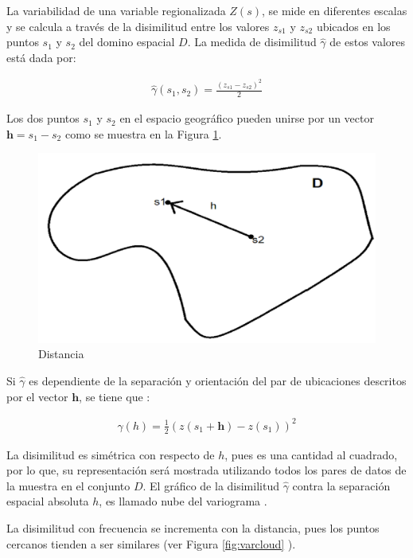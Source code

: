 \documentclass[
]{book}
\begin{document}
La variabilidad de una variable regionalizada \(Z(s)\), se mide en diferentes escalas y se calcula a través de la disimilitud entre los valores \(z_{s1}\) y \(z_{s2}\) ubicados en los puntos \(s_1\) y \(s_2\) del domino espacial \(D\). La medida de disimilitud \(\hat{\gamma}\) de estos valores está dada por:

\begin{align}
  \hat{\gamma}(s_1,s_2)=\frac{(z_{s1}-z_{s2})^2}{2}  
\end{align}

Los dos puntos \(s_1\) y \(s_2\) en el espacio geográfico pueden unirse por un vector \(\textbf{h}=s_1-s_2\) como se muestra en la Figura \ref{fig:distanciah}.

\begin{figure}
\includegraphics[width=17.78in]{figuras/otros/distancia_h} \caption{Distancia}\label{fig:distanciah}
\end{figure}

Si \(\hat{\gamma}\) es dependiente de la separación y orientación del par de ubicaciones descritos por el vector \(\textbf{h}\), se tiene que \citep{hans}:

\begin{align}
  \hat{\gamma}(h)=\frac{1}{2}(z(s_1+\textbf{h})-z(s_1))^2  
\end{align}

La disimilitud es simétrica con respecto de \(h\), pues es una cantidad al cuadrado, por lo que, su representación será mostrada utilizando todos los pares de datos de la muestra en el conjunto \(D\). El gráfico de la disimilitud \(\hat{\gamma}\) contra la separación espacial absoluta \(h\), es llamado nube del variograma \citep{hans}.

La disimilitud con frecuencia se incrementa con la distancia, pues los puntos cercanos tienden a ser similares \citep{hans} (ver Figura \ref{fig:varcloud} ).
\end{document}
